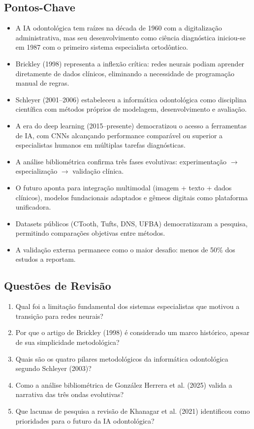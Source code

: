 \subsection{Pontos-Chave}
\begin{itemize}
    \item A IA odontológica tem raízes na década de 1960 com a digitalização administrativa, mas seu desenvolvimento como ciência diagnóstica iniciou-se em 1987 com o primeiro sistema especialista ortodôntico.
    \item Brickley (1998) representa a inflexão crítica: redes neurais podiam aprender diretamente de dados clínicos, eliminando a necessidade de programação manual de regras.
    \item Schleyer (2001--2006) estabeleceu a informática odontológica como disciplina científica com métodos próprios de modelagem, desenvolvimento e avaliação.
    \item A era do deep learning (2015--presente) democratizou o acesso a ferramentas de IA, com CNNs alcançando performance comparável ou superior a especialistas humanos em múltiplas tarefas diagnósticas.
    \item A análise bibliométrica confirma três fases evolutivas: experimentação $\rightarrow$ especialização $\rightarrow$ validação clínica.
    \item O futuro aponta para integração multimodal (imagem + texto + dados clínicos), modelos fundacionais adaptados e gêmeos digitais como plataforma unificadora.
    \item Datasets públicos (CTooth, Tufts, DNS, UFBA) democratizaram a pesquisa, permitindo comparações objetivas entre métodos.
    \item A validação externa permanece como o maior desafio: menos de 50\% dos estudos a reportam.
\end{itemize}

\subsection{Questões de Revisão}
\begin{enumerate}
    \item Qual foi a limitação fundamental dos sistemas especialistas que motivou a transição para redes neurais?
    \item Por que o artigo de Brickley (1998) é considerado um marco histórico, apesar de sua simplicidade metodológica?
    \item Quais são os quatro pilares metodológicos da informática odontológica segundo Schleyer (2003)?
    \item Como a análise bibliométrica de González Herrera et al. (2025) valida a narrativa das três ondas evolutivas?
    \item Que lacunas de pesquisa a revisão de Khanagar et al. (2021) identificou como prioridades para o futuro da IA odontológica?
\end{enumerate}

